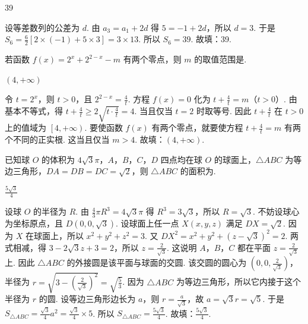 \documentclass[UTF8,a4paper,oneside,11pt]{ctexbook}
\begin{document}
\begin{answer}
39
\end{answer}

\begin{solution}
设等差数列的公差为 \(d\). 由 \(a_3=a_1+2d\) 得 \(5=-1+2d\)，所以 \(d=3\). 于是 \(S_6=\frac{6}{2}\left[ 2\times \left( -1 \right)+5\times 3 \right]=3\times 13\). 所以 \(S_6=39\).
故填：39.
\end{solution}

\begin{problem}
若函数 \(f\left( x \right)=2^x+2^{2-x}-m\) 有两个零点，则 \(m\) 的取值范围是\fillinblank{}.
\end{problem}

\begin{answer}
\(\left( 4,+\infty \right)\)
\end{answer}

\begin{solution}
令 \(t=2^x\)，则 \(t>0\)，且 \(2^{2-x}=\frac{4}{t}\). 方程 \(f(x)=0\) 化为 \(t+\frac{4}{t}=m\)（\(t>0\)）. 由基本不等式，得 \(t+\frac{4}{t}\ge 2\sqrt{t\cdot \frac{4}{t}}=4\). 当且仅当 \(t=2\) 时取等号. 因此 \(t+\frac{4}{t}\) 在 \(t>0\) 上的值域为 \(\left[ 4,+\infty \right)\).
要使函数 \(f(x)\) 有两个零点，就要使方程 \(t+\frac{4}{t}=m\) 有两个不同的正实根. 这当且仅当 \(m>4\). 故填：\(\left( 4,+\infty \right)\).
\end{solution}

\begin{problem}
已知球 \(O\) 的体积为 \(4\sqrt{3}\pi\)，\(A\)，\(B\)，\(C\)，\(D\) 四点均在球 \(O\) 的球面上，\(\triangle ABC\) 为等边三角形，\(DA=DB=DC=\sqrt{2}\)，则 \(\triangle ABC\) 的面积为\fillinblank{}.
\end{problem}

\begin{answer}
\(\frac{5\sqrt{3}}{4}\)
\end{answer}

\begin{solution}
设球 \(O\) 的半径为 \(R\). 由 \(\frac{4}{3}\pi R^3=4\sqrt{3}\pi\) 得 \(R^3=3\sqrt{3}\)，所以 \(R=\sqrt{3}\).
不妨设球心为坐标原点，且 \(D\left( 0,0,\sqrt{3} \right)\). 设球面上任一点 \(X(x,y,z)\) 满足 \(DX=\sqrt{2}\). 因为 \(X\) 在球面上，所以 \(x^2+y^2+z^2=3\). 又 \(DX^2=x^2+y^2+\left( z-\sqrt{3} \right)^2=2\). 两式相减，得 \(3-2\sqrt{3}z+3=2\)，所以 \(z=\frac{2}{\sqrt{3}}\). 这说明 \(A\)，\(B\)，\(C\) 都在平面 \(z=\frac{2}{\sqrt{3}}\) 上. 因此 \(\triangle ABC\) 的外接圆是该平面与球面的交圆.
该交圆的圆心为 \(\left( 0,0,\frac{2}{\sqrt{3}} \right)\)，半径为 \(r=\sqrt{3-\left( \frac{2}{\sqrt{3}} \right)^2}=\sqrt{\frac{5}{3}}\). 因为 \(\triangle ABC\) 为等边三角形，所以它内接于这个半径为 \(r\) 的圆. 设等边三角形边长为 \(a\)，则 \(r=\frac{a}{\sqrt{3}}\)，故 \(a=\sqrt{3}r=\sqrt{5}\). 于是 \(S_{\triangle ABC}=\frac{\sqrt{3}}{4}a^2=\frac{\sqrt{3}}{4}\times 5\). 所以 \(S_{\triangle ABC}=\frac{5\sqrt{3}}{4}\).
故填：\(\frac{5\sqrt{3}}{4}\).
\end{solution}
\end{document}
